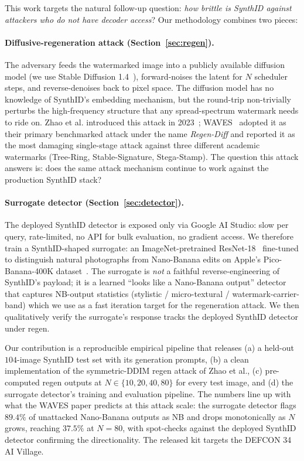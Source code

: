 \documentclass[11pt]{article}
\begin{document}
This work targets the natural follow-up question: \emph{how brittle is
SynthID against attackers who do not have decoder access}? Our
methodology combines two pieces:

\paragraph{Diffusive-regeneration attack (Section~\ref{sec:regen}).}
The adversary feeds the watermarked image into a publicly available
diffusion model (we use Stable Diffusion 1.4~\citep{rombach2022stable}),
forward-noises the latent for $N$ scheduler steps, and reverse-denoises
back to pixel space. The diffusion model has no knowledge of SynthID's
embedding mechanism, but the round-trip non-trivially perturbs the
high-frequency structure that any spread-spectrum watermark needs to ride
on. Zhao et al. introduced this attack in 2023~\citep{zhao2023provable};
WAVES~\citep{an2024waves} adopted it as their primary benchmarked attack
under the name \emph{Regen-Diff} and reported it as the most damaging
single-stage attack against three different academic watermarks
(Tree-Ring, Stable-Signature, Stega-Stamp). The question this attack
answers is: does the same attack mechanism continue to work against
the production SynthID stack?

\paragraph{Surrogate detector (Section~\ref{sec:detector}).}
The deployed SynthID detector is exposed only via Google AI Studio: slow
per query, rate-limited, no API for bulk evaluation, no gradient access.
We therefore train a SynthID-shaped surrogate: an
ImageNet-pretrained ResNet-18~\citep{he2016resnet} fine-tuned to
distinguish natural photographs from Nano-Banana edits on Apple's
Pico-Banana-400K dataset~\citep{pico-banana-400k}. The surrogate is
\emph{not} a faithful reverse-engineering of SynthID's payload; it is
a learned ``looks like a Nano-Banana output'' detector that captures
NB-output statistics (stylistic / micro-textural / watermark-carrier-band)
which we use as a fast iteration target for the regeneration attack.
We then qualitatively verify the surrogate's response tracks the deployed
SynthID detector under regen.

Our contribution is a reproducible empirical pipeline that releases (a)
a held-out $104$-image SynthID test set with its generation prompts,
(b) a clean implementation of the symmetric-DDIM regen attack of
Zhao et al., (c) pre-computed regen outputs at $N \in \{10, 20, 40, 80\}$
for every test image, and (d) the surrogate detector's training and
evaluation pipeline. The numbers line up with what the WAVES paper
predicts at this attack scale: the surrogate detector flags $89.4\%$ of
unattacked Nano-Banana outputs as NB and drops monotonically as $N$
grows, reaching $37.5\%$ at $N{=}80$, with spot-checks against the
deployed SynthID detector confirming the directionality. The released
kit targets the DEFCON 34 AI Village.
\end{document}
